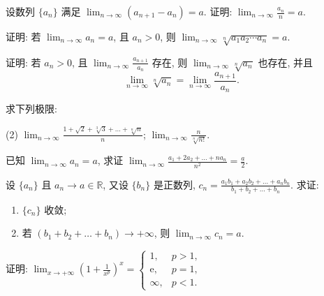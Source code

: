 \begin{exercise}[1.C.7]
    设数列 $\{a_n\}$ 满足 $\lim_{n \to \infty} (a_{n+1}-a_n) = a$. 证明: $\lim_{n \to \infty} \frac{a_n}{n} = a$.
\end{exercise}

\begin{exercise}[1.C.8]
    证明: 若 $\lim_{n \to \infty} a_n = a$, 且 $a_n > 0$, 则 $\lim_{n \to \infty} \sqrt[n]{a_1a_2\cdots a_n} = a$.
\end{exercise}

\begin{exercise}[1.C.9]
    证明: 若 $a_n > 0$, 且 $\lim_{n \to \infty} \frac{a_{n+1}}{a_n}$ 存在, 则 $\lim_{n \to \infty} \sqrt[n]{a_n}$ 也存在, 并且
    $$ \lim_{n \to \infty} \sqrt[n]{a_n} = \lim_{n \to \infty} \frac{a_{n+1}}{a_n}. $$
\end{exercise}

\begin{exercise}[1.C.10]
    求下列极限:
    \begin{tasks}[label=(\arabic*)](2)
        \task $\lim_{n \to \infty} \frac{1+\sqrt{2}+\sqrt[3]{3}+\dots+\sqrt[n]{n}}{n}$;
        \task $\lim_{n \to \infty} \frac{n}{\sqrt[n]{n!}}$.
    \end{tasks}
\end{exercise}

\begin{exercise}[1.C.11]
    已知 $\lim_{n \to \infty} a_n = a$, 求证 $\lim_{n \to \infty} \frac{a_1+2a_2+\dots+na_n}{n^2} = \frac{a}{2}$.
\end{exercise}

\begin{exercise}[1.C.12]
    设 $\{a_n\}$ 且 $a_n \to a \in \mathbb{R}$, 又设 $\{b_n\}$ 是正数列, $c_n = \frac{a_1b_1+a_2b_2+\dots+a_nb_n}{b_1+b_2+\dots+b_n}$. 求证:
    \begin{enumerate}
        \item $\{c_n\}$ 收敛;
        \item 若 $(b_1+b_2+\dots+b_n) \to +\infty$, 则 $\lim_{n \to \infty} c_n = a$.
    \end{enumerate}
\end{exercise}

\begin{exercise}[1.C.13]
    证明: $\lim_{x \to +\infty} \left(1+\frac{1}{x^p}\right)^x = \begin{cases} 1, & p > 1, \\ \mathrm{e}, & p = 1, \\ \infty, & p < 1. \end{cases}$
\end{exercise}

